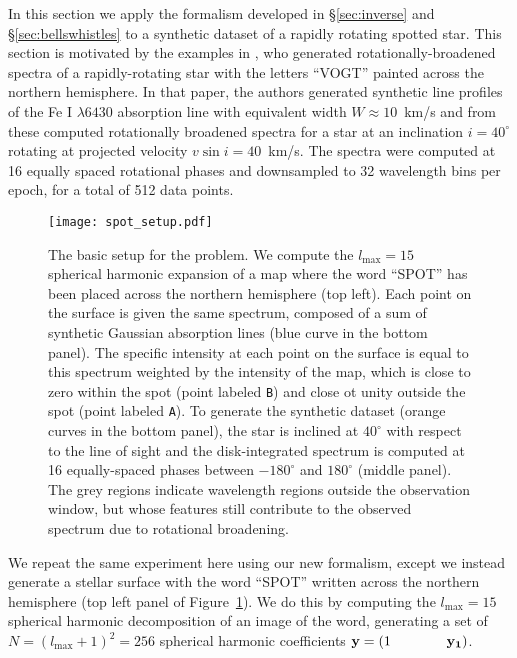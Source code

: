 \documentclass[modern]{aastex631}
\begin{document}
In this section we apply the formalism developed in \S\ref{sec:inverse} and \S\ref{sec:bellswhistles} to a synthetic dataset of a rapidly rotating spotted star. 
This section is motivated by the examples in \cite{Vogt1987}, who generated rotationally-broadened spectra of a rapidly-rotating star with the letters ``VOGT'' painted across the northern hemisphere. 
In that paper, the authors generated synthetic line profiles of the Fe I $\lambda 6430$ absorption line with equivalent width $W \approx 10$~km/s and from these computed rotationally broadened spectra for a star at an inclination $i=40^\circ$ rotating at projected velocity $v\sin i = 40$~km/s.
The spectra were computed at 16 equally spaced rotational phases and downsampled to 32 wavelength bins per epoch, for a total of 512 data points.

\begin{figure}[t!]
    \begin{centering}
        \texttt{[image: spot\_setup.pdf]}
        \caption{%
            The basic setup for the \spot problem. 
            We compute the $l_\mathrm{max} = 15$ spherical harmonic expansion of a map where the word ``SPOT'' has been placed across the northern hemisphere (top left). 
            Each point on the surface is given the same spectrum, composed of a sum of synthetic Gaussian absorption lines (blue curve in the bottom panel).
            The specific intensity at each point on the surface is equal to this spectrum weighted by the intensity of the map, which is close to zero within the spot (point labeled \texttt{B}) and close ot unity outside the spot (point labeled \texttt{A}).
            To generate the synthetic dataset (orange curves in the bottom panel), the star is inclined at $40^\circ$ with respect to the line of sight and the disk-integrated spectrum is computed at 16 equally-spaced phases between $-180^\circ$ and $180^\circ$ (middle panel).
            The grey regions indicate wavelength regions outside the observation window, but whose features still contribute to the observed spectrum due to rotational broadening.
        }
        \label{fig:spot_setup}
    \end{centering}
\end{figure}

We repeat the same experiment here using our new formalism, except we instead generate a stellar surface with the word ``SPOT'' written across the northern hemisphere (top left panel of Figure~\ref{fig:spot_setup}).
We do this by computing the $l_\mathrm{max} = 15$ spherical harmonic decomposition of an image of the word, generating a set of $N = (l_\mathrm{max} + 1)^2 = 256$ spherical harmonic coefficients ${\mathbf{y}} = (1 \quad\quad\quad\quad {\ensuremath{\mathbf{y_1}}})$.
\end{document}
